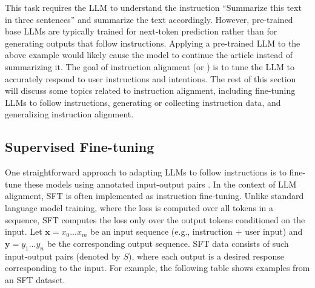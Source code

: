 \noindent This task requires the LLM to understand the instruction ``Summarize this text in three sentences'' and summarize the text accordingly. However, pre-trained base LLMs are typically trained for next-token prediction rather than for generating outputs that follow instructions. Applying a pre-trained LLM to the above example would likely cause the model to continue the article instead of summarizing it. The goal of instruction alignment (or ) is to tune the LLM to accurately respond to user instructions and intentions. The rest of this section will discuss some topics related to instruction alignment, including fine-tuning LLMs to follow instructions, generating or collecting instruction data, and generalizing instruction alignment.

\subsection{Supervised Fine-tuning}

\noindent One straightforward approach to adapting LLMs to follow instructions is to fine-tune these models using annotated input-output pairs \cite{ouyang-etal:2022training,wei-etal:2022finetuned}. In the context of LLM alignment, SFT is often implemented as instruction fine-tuning. Unlike standard language model training, where the loss is computed over all tokens in a sequence, SFT computes the loss only over the output tokens conditioned on the input. Let $\mathbf{x}=x_0...x_m$ be an input sequence (e.g., instruction + user input) and $\mathbf{y}=y_1...y_n$ be the corresponding output sequence. SFT data consists of such input-output pairs (denoted by $S$), where each output is a desired response corresponding to the input. For example, the following table shows examples from an SFT dataset.

